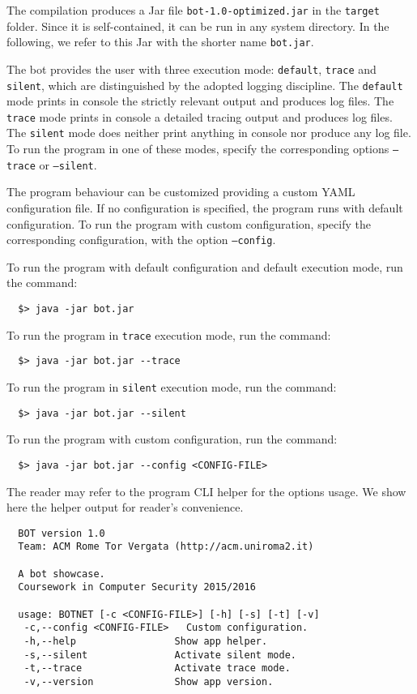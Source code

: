 The compilation produces a Jar file \texttt{bot-1.0-optimized.jar} in the \texttt{target} folder. Since it is self-contained, it can be run in any system directory. In the following, we refer to this Jar with the shorter name \texttt{bot.jar}.

The bot provides the user with three execution mode: \texttt{default}, \texttt{trace} and \texttt{silent}, which are distinguished by the adopted logging discipline. The \texttt{default} mode prints in console the strictly relevant output and produces log files. The \texttt{trace} mode prints in console a detailed tracing output and produces log files. The \texttt{silent} mode does neither print anything in console nor produce any log file.
To run the program in one of these modes, specify the corresponding options \texttt{--trace} or \texttt{--silent}.

The program behaviour can be customized providing a custom YAML configuration file. If no configuration is specified, the program runs with default configuration. To run the program with custom configuration, specify the corresponding configuration, with the option \texttt{--config}.

To run the program with default configuration and default execution mode, run the command:

\begin{verbatim}
  $> java -jar bot.jar
\end{verbatim}

To run the program in \texttt{trace} execution mode, run the command:

\begin{verbatim}
  $> java -jar bot.jar --trace
\end{verbatim}

To run the program in \texttt{silent} execution mode, run the command:

\begin{verbatim}
  $> java -jar bot.jar --silent
\end{verbatim}

To run the program with custom configuration, run the command:

\begin{verbatim}
  $> java -jar bot.jar --config <CONFIG-FILE>
\end{verbatim}

The reader may refer to the program CLI helper for the options usage. We show here the helper output for reader's convenience.

\begin{verbatim}
  BOT version 1.0
  Team: ACM Rome Tor Vergata (http://acm.uniroma2.it)

  A bot showcase.
  Coursework in Computer Security 2015/2016

  usage: BOTNET [-c <CONFIG-FILE>] [-h] [-s] [-t] [-v]
   -c,--config <CONFIG-FILE>   Custom configuration.
   -h,--help                 Show app helper.
   -s,--silent               Activate silent mode.
   -t,--trace                Activate trace mode.
   -v,--version              Show app version.
\end{verbatim}

